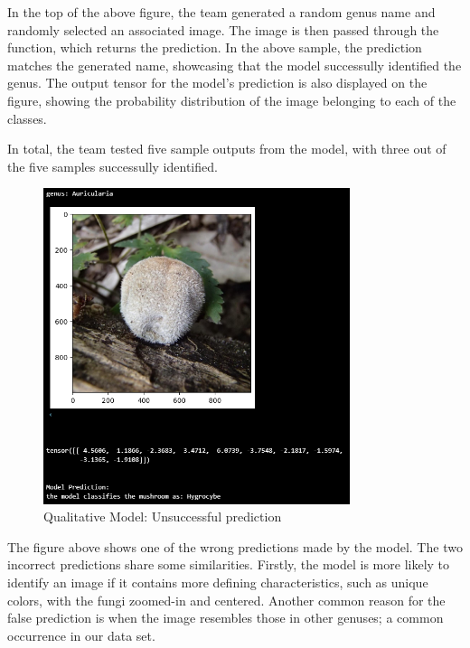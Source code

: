 \documentclass{article} %
\begin{document}
In the top of the above figure, the team generated a random genus name and randomly selected an associated image. The image is then passed through the function, which returns the prediction. In the above sample, the prediction matches the generated name, showcasing that the model successully identified the genus. The output tensor for the model's prediction is also displayed on the figure, showing the probability distribution of the image belonging to each of the classes.

In total, the team tested five sample outputs from the model, with three out of the five samples successully identified. 

\FloatBarrier
\begin{figure}[h]
    \begin{center}
    \includegraphics[width=0.8\textwidth]{figures/qualitativeResultImg2.png}
    \end{center}
    \caption{Qualitative Model: Unsuccessful prediction}
    \label{fig:badPrediction}
\end{figure}
\FloatBarrier

The figure above shows one of the wrong predictions made by the model. The two incorrect predictions share some similarities. Firstly, the model is more likely to identify an image if it contains more defining characteristics, such as unique colors, with the fungi zoomed-in and centered. Another common reason for the false prediction is when the image resembles those in other genuses; a common occurrence in our data set.
\end{document}
